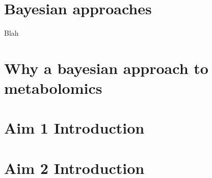 \begin{DoubleSpace*}
\section{Bayesian approaches}
Blah

\section{Why a bayesian approach to metabolomics}

\section{Aim 1 Introduction}

\section{Aim 2 Introduction}
\end{DoubleSpace*}